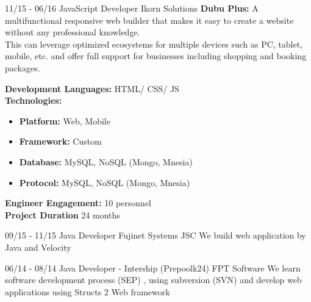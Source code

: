 \documentclass[]{friggeri-cv}
\begin{document}
\begin{entrylist}
\entry
    {11/15 - 06/16}
    {JavaScript Developer}
    {Ikorn Solutions}
	{\textbf{Dubu Plus: } A multifunctional responsive web builder that makes it easy to create a website without any professional knowledge.
	\\ This can leverage optimized ecosystems for multiple devices such as PC, tablet, mobile, etc. and offer full support for businesses including shopping and booking packages.\\
}
\end{entrylist}

\begin{entrylist}
\entry
{}
{}
{}
{
		 \textbf{Development Languages:} HTML/ CSS/ JS~\\
		 \textbf{Technologies:}~
			\begin{itemize}
				\item \textbf{Platform:} Web,  Mobile
				\item \textbf{Framework:} Custom
				\item \textbf{Database:} MySQL, NoSQL (Mongo, Mnesia)
				\item \textbf{Protocol:} MySQL, NoSQL (Mongo, Mnesia)
			\end{itemize}
		 \textbf{Engineer Engagement:} 10 personnel\\
		 \textbf{Project Duration} 24  months\\
	}
\end{entrylist}

\begin{entrylist}
  \entry
    {09/15 - 11/15}
    {Java Developer}
    {Fujinet Systems JSC}
    {We build web application by Java and Velocity\\}
\end{entrylist}

\begin{entrylist}
    \entry
    {06/14 - 08/14}
    {Java Developer - Intership (Prepoolk24)}
    {FPT Software}
    {We learn software development process (SEP) , using subversion (SVN) and develop web applications using Structs 2 Web framework\\}
\end{entrylist}
\end{document}
